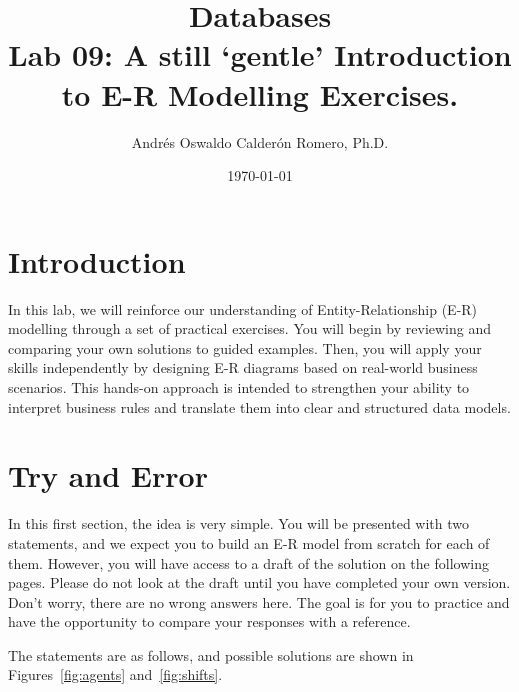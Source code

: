 \documentclass{article}
\title{Databases \\ Lab 09: A still `gentle' Introduction to E-R Modelling Exercises.}
\author{Andrés Oswaldo Calderón Romero, Ph.D.}
\date{\today}
\begin{document}
\maketitle

\section{Introduction}

In this lab, we will reinforce our understanding of Entity-Relationship (E-R) modelling through a set of practical exercises. You will begin by reviewing and comparing your own solutions to guided examples. Then, you will apply your skills independently by designing E-R diagrams based on real-world business scenarios. This hands-on approach is intended to strengthen your ability to interpret business rules and translate them into clear and structured data models.

\section{Try and Error} \label{sec:try}
In this first section, the idea is very simple. You will be presented with two statements, and we expect you to build an E-R model from scratch for each of them. However, you will have access to a draft of the solution on the following pages. Please do not look at the draft until you have completed your own version. Don’t worry, there are no wrong answers here. The goal is for you to practice and have the opportunity to compare your responses with a reference.

The statements are as follows, and possible solutions are shown in Figures~\ref{fig:agents} and~\ref{fig:shifts}.
\end{document}
